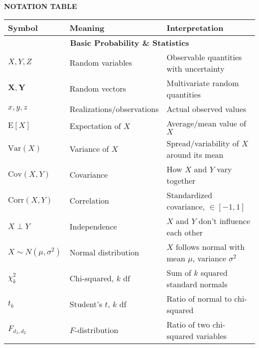 \documentclass[10pt]{article}
\newcommand{\Var}{\mathrm{Var}}
\newcommand{\Cov}{\mathrm{Cov}}
\newcommand{\Corr}{\mathrm{Corr}}
\renewcommand{\E}{\mathrm{E}}
\newcommand{\vect}[1]{\symbf{#1}} %
\begin{document}
\begin{center}
  \textbf{NOTATION TABLE}
\end{center}
\begin{center}
  \scriptsize
  \begin{tabular}{l l l}
    \toprule
    \textbf{Symbol}            & \textbf{Meaning}               & \textbf{Interpretation}                                 \\
    \midrule
    \multicolumn{3}{c}{\textbf{Basic Probability \& Statistics}}                                                          \\
    $X, Y, Z$                  & Random variables               & Observable quantities with uncertainty                  \\
    $\vect{X}, \vect{Y}$       & Random vectors                 & Multivariate random quantities                          \\
    $x, y, z$                  & Realizations/observations      & Actual observed values                                  \\
    $\E[X]$                    & Expectation of $X$             & Average/mean value of $X$                               \\
    $\Var(X)$                  & Variance of $X$                & Spread/variability of $X$ around its mean               \\
    $\Cov(X,Y)$                & Covariance                     & How $X$ and $Y$ vary together                           \\
    $\Corr(X,Y)$               & Correlation                    & Standardized covariance, $\in [-1,1]$                   \\
    $X \perp Y$                & Independence                   & $X$ and $Y$ don't influence each other                  \\
    $X \sim N(\mu, \sigma^2)$  & Normal distribution            & $X$ follows normal with mean $\mu$, variance $\sigma^2$ \\
    $\chi^2_k$                 & Chi-squared, $k$ df            & Sum of $k$ squared standard normals                     \\
    $t_k$                      & Student's $t$, $k$ df          & Ratio of normal to chi-squared                          \\
    $F_{d_1,d_2}$              & $F$-distribution               & Ratio of two chi-squared variables                      \\

\end{tabular}
\end{center}
\end{document}
